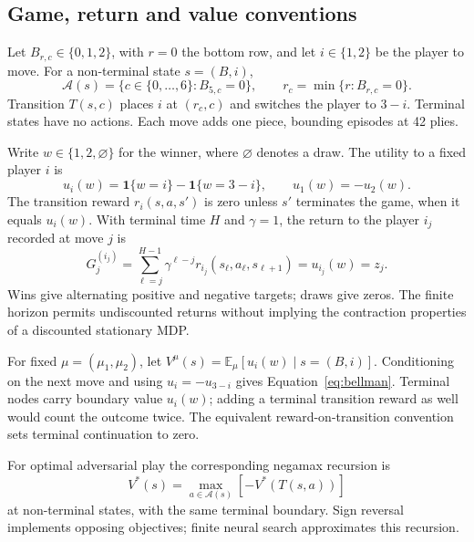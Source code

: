 \documentclass[letterpaper]{article}
\begin{document}
\subsection{Game, return and value conventions}
\label{app:game-math}
Let $B_{r,c}\in\{0,1,2\}$, with $r=0$ the bottom row, and let $i\in\{1,2\}$
be the player to move. For a non-terminal state $s=(B,i)$,
\begin{equation}
 \mathcal A(s)=\{c\in\{0,\ldots,6\}:B_{5,c}=0\},\qquad
 r_c=\min\{r:B_{r,c}=0\}.
 \label{eq:legal-transition}
\end{equation}
Transition $T(s,c)$ places $i$ at $(r_c,c)$ and switches the player to $3-i$.
Terminal states have no actions. Each move adds one piece, bounding episodes at
42 plies.

Write $w\in\{1,2,\varnothing\}$ for the winner, where $\varnothing$ denotes a draw.
The utility to a fixed player $i$ is
\begin{equation}
 u_i(w)=\mathbf 1\{w=i\}-\mathbf 1\{w=3-i\},\qquad u_1(w)=-u_2(w).
 \label{eq:utility}
\end{equation}
The transition reward $r_i(s,a,s')$ is zero unless $s'$ terminates the game, when
it equals $u_i(w)$. With terminal time $H$ and $\gamma=1$, the return to the
player $i_j$ recorded at move $j$ is
\begin{equation}
 G_j^{(i_j)}=\sum_{\ell=j}^{H-1}\gamma^{\ell-j}
 r_{i_j}(s_\ell,a_\ell,s_{\ell+1})=u_{i_j}(w)=z_j.
 \label{eq:mc-return}
\end{equation}
Wins give alternating positive and negative targets; draws give zeros.
The finite horizon permits undiscounted returns without implying the contraction
properties of a discounted stationary MDP.

For fixed $\mu=(\mu_1,\mu_2)$, let
$V^\mu(s)=\mathbb E_\mu[u_i(w)\mid s=(B,i)]$.
Conditioning on the next move and using $u_i=-u_{3-i}$ gives
Equation~\eqref{eq:bellman}. Terminal nodes carry boundary value $u_i(w)$;
adding a terminal transition reward as well would count the outcome twice.
The equivalent reward-on-transition convention sets terminal continuation to zero.

For optimal adversarial play the corresponding negamax recursion is
\begin{equation}
 V^*(s)=\max_{a\in\mathcal A(s)}[-V^*(T(s,a))]
 \label{eq:negamax}
\end{equation}
at non-terminal states, with the same terminal boundary. Sign reversal implements
opposing objectives; finite neural search approximates this recursion.
\end{document}
